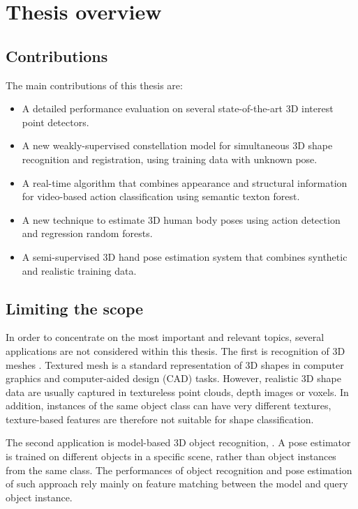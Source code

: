 \section{Thesis overview}

\subsection{Contributions}

The main contributions of this thesis are:
\begin{itemize}
	\item A detailed performance evaluation on several state-of-the-art 3D interest point detectors.
	\item A new weakly-supervised constellation model for simultaneous 3D shape recognition and registration, using training data with unknown pose. 
	\item A real-time algorithm that combines appearance and structural information for video-based action classification using semantic texton forest. 
	\item A new technique to estimate 3D human body poses using action detection and regression random forests. 
	\item A semi-supervised 3D hand pose estimation system that combines synthetic and realistic training data. 
\end{itemize}

\subsection{Limiting the scope}

In order to concentrate on the most important and relevant topics, 
several applications are not considered within this thesis. 
The first is recognition of 3D meshes \cite{Zaharescu2009, Bronstein2011, Kokkinos2012}. Textured mesh is a standard representation of 3D shapes in computer graphics and computer-aided design (CAD) tasks. However, realistic 3D shape data are usually captured in textureless point clouds, depth images or voxels. In addition, instances of the same object class can have very different textures, texture-based features are therefore not suitable for shape classification.      

The second application is model-based 3D object recognition, \eg \cite{Mian2006, Rothganger2006, Shang2010}. A pose estimator is trained on different objects in a specific scene, rather than object instances from the same class. The performances of object recognition and pose estimation of such approach rely mainly on feature matching between the model and query object instance. 

